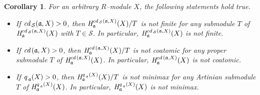 \documentclass[10pt]{amsart}
\newtheorem{cor}[thm]{Corollary}
\newcommand{\cd}{\mbox{cd}\,}
\newcommand{\q}{\mbox{q}\,}
\renewcommand{\H}{\mbox{H}}
\newcommand{\fa}{\mathfrak{a}}
\begin{document}
\begin{cor} \label {3-3} For an arbitrary $R$--module $X$, the following statements hold true.
               \begin{itemize}
                   \item[(i)]{If $\emph{\cd}_{\mathcal{S}}(\fa, X)> 0$, then $\emph{\H}^{\emph{\cd}_{\mathcal{S}}
                   (\fa, X)}_{\fa}(X)/T$ is not finite for any submodule $T$ of $\emph{\H}^{\emph{\cd}_{\mathcal{S}}
                   (\fa, X)}_{\fa}(X)$ with $T \in \mathcal{S}.$
                   In particular, $\emph{\H}^{\emph{\cd}_{\mathcal{S}}
                   (\fa, X)}_{\fa}(X)$ is not finite.}
                   \item[(ii)]{If $\emph{\cd}(\fa, X)> 0$,
                   then $\emph{\H}^{\emph{\cd}(\fa, X)}_{\fa}(X)/T$
                   is not coatomic for any proper submodule $T$ of $\emph{\H}^{\emph{\cd}(\fa, X)}_{\fa}(X)$.
                   In particular, $\emph{\H}^{\emph{\cd}(\fa, X)}_{\fa}(X)$ is not
                   coatomic.}
                   \item[(iii)]{If $\emph{\q}_{\fa}(X)> 0$, then $\emph{\H}_{\fa}^{\emph{\q}_{\fa}(X)}(X)/T$
                   is not minimax for any Artinian submodule $T$ of $\emph{\H}_{\fa}^{\emph{\q}_{\fa}(X)}(X)$.
                   In particular, $\emph{\H}_{\fa}^{\emph{\q}_{\fa}(X)}(X)$ is not minimax.}
               \end{itemize}
\end{cor}
\end{document}
